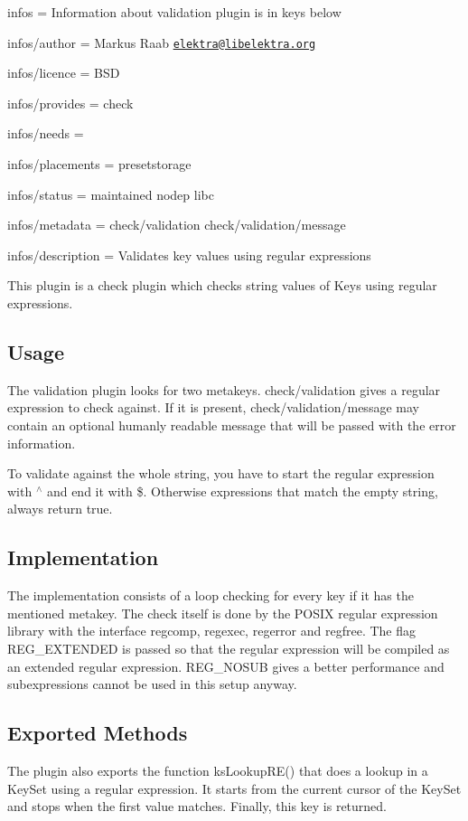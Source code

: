 
\begin{DoxyItemize}
\item infos = Information about validation plugin is in keys below
\item infos/author = Markus Raab \href{mailto:elektra@libelektra.org}{\tt elektra@libelektra.\+org}
\item infos/licence = B\+S\+D
\item infos/provides = check
\item infos/needs =
\item infos/placements = presetstorage
\item infos/status = maintained nodep libc
\item infos/metadata = check/validation check/validation/message
\item infos/description = Validates key values using regular expressions
\end{DoxyItemize}

This plugin is a check plugin which checks string values of Keys using regular expressions.

\subsection*{Usage}

The validation plugin looks for two metakeys. {\ttfamily check/validation} gives a regular expression to check against. If it is present, {\ttfamily check/validation/message} may contain an optional humanly readable message that will be passed with the error information.

To validate against the whole string, you have to start the regular expression with {\ttfamily $^\wedge$} and end it with {\ttfamily \$}. Otherwise expressions that match the empty string, always return true.

\subsection*{Implementation}

The implementation consists of a loop checking for every key if it has the mentioned metakey. The check itself is done by the P\+O\+S\+I\+X regular expression library with the interface {\ttfamily regcomp}, {\ttfamily regexec}, {\ttfamily regerror} and {\ttfamily regfree}. The flag {\ttfamily R\+E\+G\+\_\+\+E\+X\+T\+E\+N\+D\+E\+D} is passed so that the regular expression will be compiled as an extended regular expression. {\ttfamily R\+E\+G\+\_\+\+N\+O\+S\+U\+B} gives a better performance and subexpressions cannot be used in this setup anyway.

\subsection*{Exported Methods}

The plugin also exports the function {\ttfamily ks\+Lookup\+R\+E()} that does a lookup in a Key\+Set using a regular expression. It starts from the current cursor of the Key\+Set and stops when the first value matches. Finally, this key is returned. 
